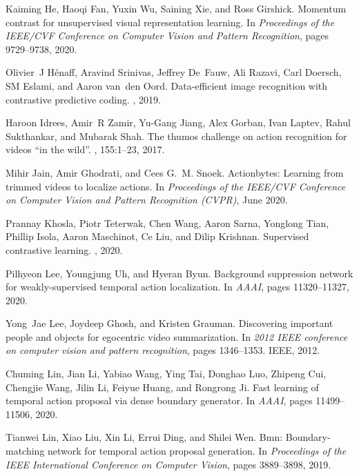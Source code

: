 \documentclass[final]{cvpr}
\begin{document}
\begin{table*}[t]
{\begin{thebibliography}{10}
Kaiming He, Haoqi Fan, Yuxin Wu, Saining Xie, and Ross Girshick.
\newblock Momentum contrast for unsupervised visual representation learning.
\newblock In {\em Proceedings of the IEEE/CVF Conference on Computer Vision and
  Pattern Recognition}, pages 9729--9738, 2020.

Olivier~J H{\'e}naff, Aravind Srinivas, Jeffrey De~Fauw, Ali Razavi, Carl
  Doersch, SM Eslami, and Aaron van~den Oord.
\newblock Data-efficient image recognition with contrastive predictive coding.
, 2019.

Haroon Idrees, Amir~R Zamir, Yu-Gang Jiang, Alex Gorban, Ivan Laptev, Rahul
  Sukthankar, and Mubarak Shah.
\newblock The thumos challenge on action recognition for videos “in the
  wild”.
, 155:1--23, 2017.

Mihir Jain, Amir Ghodrati, and Cees G.~M. Snoek.
\newblock Actionbytes: Learning from trimmed videos to localize actions.
\newblock In {\em Proceedings of the IEEE/CVF Conference on Computer Vision and
  Pattern Recognition (CVPR)}, June 2020.

Prannay Khosla, Piotr Teterwak, Chen Wang, Aaron Sarna, Yonglong Tian, Phillip
  Isola, Aaron Maschinot, Ce Liu, and Dilip Krishnan.
\newblock Supervised contrastive learning.
, 2020.

Pilhyeon Lee, Youngjung Uh, and Hyeran Byun.
\newblock Background suppression network for weakly-supervised temporal action
  localization.
\newblock In {\em AAAI}, pages 11320--11327, 2020.

Yong~Jae Lee, Joydeep Ghosh, and Kristen Grauman.
\newblock Discovering important people and objects for egocentric video
  summarization.
\newblock In {\em 2012 IEEE conference on computer vision and pattern
  recognition}, pages 1346--1353. IEEE, 2012.

Chuming Lin, Jian Li, Yabiao Wang, Ying Tai, Donghao Luo, Zhipeng Cui, Chengjie
  Wang, Jilin Li, Feiyue Huang, and Rongrong Ji.
\newblock Fast learning of temporal action proposal via dense boundary
  generator.
\newblock In {\em AAAI}, pages 11499--11506, 2020.

Tianwei Lin, Xiao Liu, Xin Li, Errui Ding, and Shilei Wen.
\newblock Bmn: Boundary-matching network for temporal action proposal
  generation.
\newblock In {\em Proceedings of the IEEE International Conference on Computer
  Vision}, pages 3889--3898, 2019.


\end{thebibliography}}
\end{table*}
\end{document}
